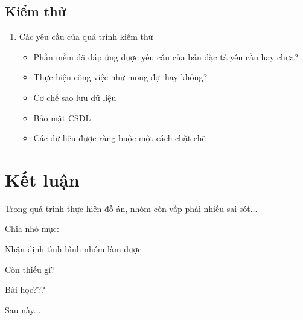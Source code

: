 \documentclass{article}
\begin{document}
			\subsection{Kiểm thử}
			
				\begin{enumerate}
					\item Các yêu cầu của quá trình kiểm thử
					
						\begin{itemize}
							\item Phần mềm đã đáp ứng được yêu cầu của bản đặc tả yêu cầu hay chưa?
							\item Thực hiện công việc như mong đợi hay không?
							\item Cơ chế sao lưu dữ liệu
							\item Bảo mật CSDL
							\item Các dữ liệu được ràng buộc một cách chặt chẽ
						\end{itemize}
					
				\end{enumerate}
			
	\newpage			
	\section{Kết luận}
	
	Trong quá trình thực hiện đồ án, nhóm còn vấp phải nhiều sai sót...
	
	
	Chia nhỏ mục:
	
	Nhận định tình hình nhóm làm được
	
	Còn thiếu gì?
	
	Bài học???
	
	Sau này...
	
\end{document}
